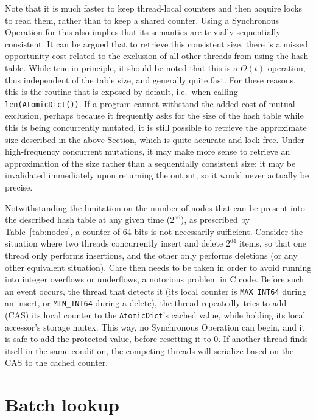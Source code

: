 Note that it is much faster to keep thread-local counters and then acquire locks to read them, rather than to keep a shared counter.
Using a Synchronous Operation for this also implies that its semantics are trivially sequentially consistent.
It can be argued that to retrieve this consistent size, there is a missed opportunity cost related to the exclusion of all other threads from using the hash table.
While true in principle, it should be noted that this is a $\Theta(t)$ operation, thus independent of the table size, and generally quite fast.
For these reasons, this is the routine that is exposed by default, i.e.\ when calling \texttt{{len(AtomicDict())}}.
If a program cannot withstand the added cost of mutual exclusion, perhaps because it frequently asks for the size of the hash table while this is being concurrently mutated, it is still possible to retrieve the approximate size described in the above Section, which is quite accurate and lock-free.
Under high-frequency concurrent mutations, it may make more sense to retrieve an approximation of the size rather than a sequentially consistent size: it may be invalidated immediately upon returning the output, so it would never actually be precise.

Notwithstanding the limitation on the number of nodes that can be present into the described hash table at any given time ($2^{56}$), as prescribed by Table~\ref{tab:nodes}, a counter of 64-bits is not necessarily sufficient.
Consider the situation where two threads concurrently insert and delete $2^{64}$ items, so that one thread only performs insertions, and the other only performs deletions (or any other equivalent situation).
Care then needs to be taken in order to avoid running into integer overflows or underflows, a notorious problem in C code.
Before such an event occurs, the thread that detects it (its local counter is \texttt{MAX\_INT64} during an insert, or \texttt{MIN\_INT64} during a delete), the thread repeatedly tries to add (CAS) its local counter to the \texttt{AtomicDict}'s cached value, while holding its local accessor's storage mutex.
This way, no Synchronous Operation can begin, and it is safe to add the protected value, before resetting it to 0.
If another thread finds itself in the same condition, the competing threads will serialize based on the CAS to the cached counter.


\section{Batch lookup}\label{sec:batch-lookup}

